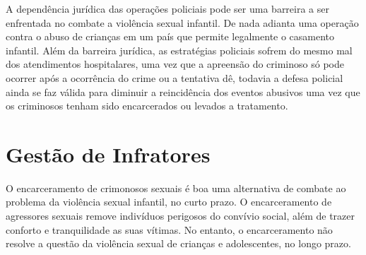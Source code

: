 A dependência jurídica das operações policiais pode ser uma barreira a ser enfrentada no combate a violência sexual infantil. De nada adianta uma operação contra o abuso de crianças em um país que permite legalmente o casamento infantil. Além da barreira jurídica, as estratégias policiais sofrem do mesmo mal dos atendimentos hospitalares, uma vez que a apreensão do criminoso só pode ocorrer após a ocorrência do crime ou a tentativa dê, todavia a defesa policial ainda se faz válida para diminuir a reincidência dos eventos abusivos uma vez que os criminosos tenham sido encarcerados ou levados a tratamento. 


%
%


\section{Gestão de Infratores}\label{sec:infratores}


O encarceramento de crimonosos sexuais é boa uma alternativa de combate ao problema da violência sexual infantil, no curto prazo. O encarceramento de agressores sexuais remove indivíduos perigosos do convívio social, além de trazer conforto e tranquilidade as suas vítimas. No entanto, o encarceramento não resolve a questão da violência sexual de crianças e adolescentes, no longo prazo.  

